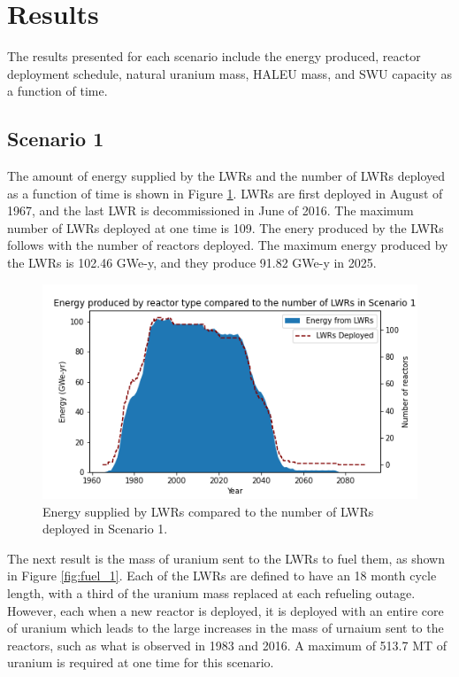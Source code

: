 \section{Results}
The results presented for each scenario include the energy produced, reactor 
deployment schedule, natural
uranium mass, \gls{HALEU} mass, and \gls{SWU} capacity as a function of time. 

\subsection{Scenario 1}
The amount of energy supplied by the \glspl{LWR} and the number of \glspl{LWR}
deployed as a function of time is shown in Figure \ref{fig:energy_rx_1}. 
\glspl{LWR} are first deployed in August of 1967, and the last 
\gls{LWR} is decommissioned in June of 2016. The maximum number of 
\glspl{LWR} deployed at one time is 109. The enery produced by the 
\glspl{LWR} follows with the number of reactors deployed. The maximum energy 
produced by the \glspl{LWR} is 102.46 GWe-y, and they produce 91.82 GWe-y 
in 2025.

\begin{figure}
    \centering 
    \includegraphics[scale=0.5]{figures/energy_scenario1.png}
    \caption{Energy supplied by \glspl{LWR} compared to the number of 
    \glspl{LWR} deployed in Scenario 1.}
    \label{fig:energy_rx_1}
\end{figure}

The next result is the mass of uranium sent to the \glspl{LWR} to fuel 
them, as shown in Figure \ref{fig:fuel_1}. Each of the \glspl{LWR} are 
defined to have an 18 month cycle length, with a third of the uranium 
mass replaced at each refueling outage. However, each when a new reactor 
is deployed, it is deployed with an entire core of uranium which leads 
to the large increases in the mass of urnaium sent to the reactors, such 
as what is observed in 1983 and 2016. A maximum of 513.7 MT of uranium 
is required at one time for this scenario.

